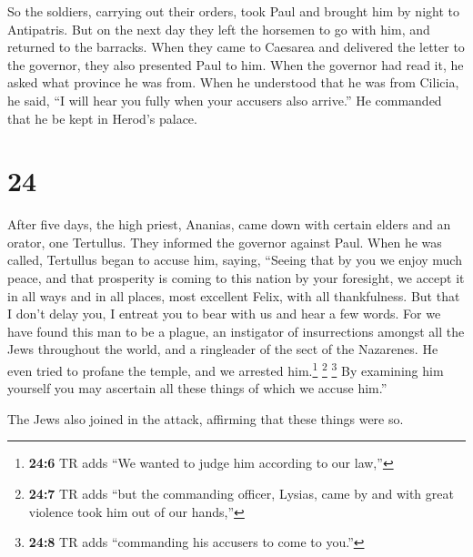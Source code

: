  So the soldiers, carrying out their orders, took Paul
and brought him by night to Antipatris.  But on the next
day they left the horsemen to go with him, and returned to the barracks.
 When they came to Caesarea and delivered the letter to
the governor, they also presented Paul to him.  When the
governor had read it, he asked what province he was from. When he
understood that he was from Cilicia, he said,  ``I will
hear you fully when your accusers also arrive.'' He commanded that he be
kept in Herod's palace.

\hypertarget{section-23}{%
\section{24}\label{section-23}}

 After five days, the high priest, Ananias, came down with
certain elders and an orator, one Tertullus. They informed the governor
against Paul.  When he was called, Tertullus began to
accuse him, saying, ``Seeing that by you we enjoy much peace, and that
prosperity is coming to this nation by your foresight,  we
accept it in all ways and in all places, most excellent Felix, with all
thankfulness.  But that I don't delay you, I entreat you
to bear with us and hear a few words.  For we have found
this man to be a plague, an instigator of insurrections amongst all the
Jews throughout the world, and a ringleader of the sect of the
Nazarenes.  He even tried to profane the temple, and we
arrested him.\footnote{\textbf{24:6} TR adds ``We wanted to judge him
  according to our law,''}  \footnote{\textbf{24:7} TR
  adds ``but the commanding officer, Lysias, came by and with great
  violence took him out of our hands,''}  \footnote{\textbf{24:8}
  TR adds ``commanding his accusers to come to you.''} By examining him
yourself you may ascertain all these things of which we accuse him.''

 The Jews also joined in the attack, affirming that these
things were so.


